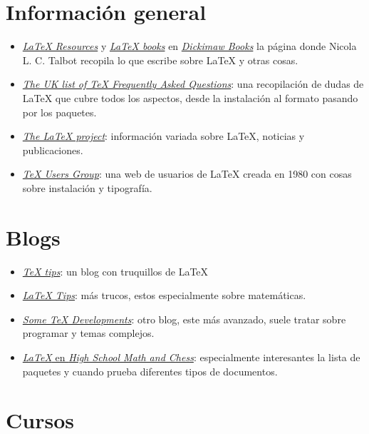\section{Información general}

\begin{itemize}
\item
  \href{http://www.dickimaw-books.com/latexresources.html}{\emph{LaTeX
  Resources}} y
  \href{http://www.dickimaw-books.com/latex/index.html}{\emph{LaTeX
  books}} en \href{http://www.dickimaw-books.com/}{\emph{Dickimaw
  Books}} la página donde Nicola L. C. Talbot recopila lo que escribe
  sobre LaTeX y otras cosas.
\item
  \href{http://www.tex.ac.uk/faq/}{\emph{The UK list of TeX Frequently
  Asked Questions}}: una recopilación de dudas de LaTeX que cubre todos
  los aspectos, desde la instalación al formato pasando por los
  paquetes.
\item
  \href{http://www.latex-project.org/}{\emph{The LaTeX project}}:
  información variada sobre LaTeX, noticias y publicaciones.
\item
  \href{http://tug.org/}{\emph{TeX Users Group}}: una web de usuarios de
  LaTeX creada en 1980 con cosas sobre instalación y tipografía.
\end{itemize}

\section{Blogs}

\begin{itemize}
\item
  \href{http://texstudio.de/}{\emph{TeX tips}}: un blog con truquillos
  de LaTeX
\item
  \href{http://www.math.illinois.edu/~ajh/tex/tips.html}{\emph{LaTeX
  Tips}}: más trucos, estos especialmente sobre matemáticas.
\item
  \href{http://www.texdev.net/}{\emph{Some TeX Developments}}: otro
  blog, este más avanzado, suele tratar sobre programar y temas
  complejos.
\item
  \href{http://www.highschoolmathandchess.com/latex/}{\emph{LaTeX} en
  \emph{High School Math and Chess}}: especialmente interesantes la
  lista de paquetes y cuando prueba diferentes tipos de documentos.
\end{itemize}

\section{Cursos}

